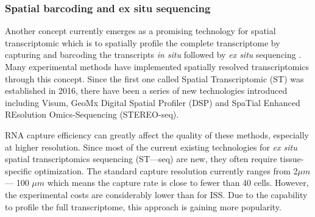 \subsubsection{Spatial barcoding and ex situ sequencing}
Another concept currently emerges as a promising technology for spatial transcriptomic which is to spatially profile the complete transcriptome by capturing and barcoding the transcripts \textit{in situ} followed by \textit{ex situ} sequencing \cite{asp2020spatially}. Many experimental methods have implemented spatially resolved transcriptomics through this concept. Since the first one called Spatial Transcriptomic (ST) was established in 2016, there have been a series of new technologies introduced including Visum, GeoMx Digital Spatial Profiler (DSP) and SpaTial Enhanced REsolution Omics-Sequencing (STEREO-seq). 

RNA capture efficiency can greatly affect the quality of these methods, especially at higher resolution. Since most of the current existing technologies for \textit{ex situ} spatial transcriptomics sequencing (ST—seq) are new, they often require tissue-specific optimization. The standard capture resolution currently ranges from 2$\mu m$ — 100 $\mu m$ which means the capture rate is close to fewer than 40 cells. However, the experimental costs are considerably lower than for ISS. Due to the capability to profile the full transcriptome, this approach is gaining more popularity.          

